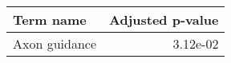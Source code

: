 \begin{tabular}{lr}
\toprule
     Term name &  Adjusted p-value \\
\midrule
 Axon guidance &          3.12e-02 \\
\bottomrule
\end{tabular}
